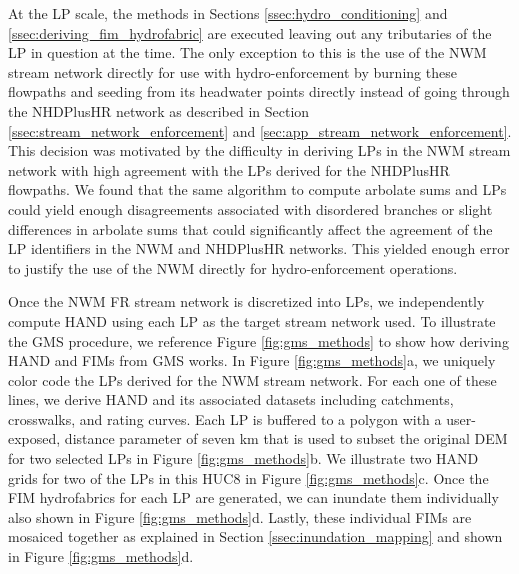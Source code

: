 At the LP scale, the methods in Sections \ref{ssec:hydro_conditioning} and \ref{ssec:deriving_fim_hydrofabric} are executed leaving out any tributaries of the LP in question at the time.
The only exception to this is the use of the NWM stream network directly for use with hydro-enforcement by burning these flowpaths and seeding from its headwater points directly instead of going through the NHDPlusHR network as described in Section \ref{ssec:stream_network_enforcement} and \ref{sec:app_stream_network_enforcement}.
This decision was motivated by the difficulty in deriving LPs in the NWM stream network with high agreement with the LPs derived for the NHDPlusHR flowpaths.
We found that the same algorithm to compute arbolate sums and LPs could yield enough disagreements associated with disordered branches or slight differences in arbolate sums that could significantly affect the agreement of the LP identifiers in the NWM and NHDPlusHR networks.
This yielded enough error to justify the use of the NWM directly for hydro-enforcement operations.

Once the NWM FR stream network is discretized into LPs, we independently compute HAND using each LP as the target stream network used.
To illustrate the GMS procedure, we reference Figure \ref{fig:gms_methods} to show how deriving HAND and FIMs from GMS works.
In Figure \ref{fig:gms_methods}a, we uniquely color code the LPs derived for the NWM stream network. 
For each one of these lines, we derive HAND and its associated datasets including catchments, crosswalks, and rating curves.
Each LP is buffered to a polygon with a user-exposed, distance parameter of seven km that is used to subset the original DEM for two selected LPs in Figure \ref{fig:gms_methods}b.
We illustrate two HAND grids for two of the LPs in this HUC8 in Figure \ref{fig:gms_methods}c.
Once the FIM hydrofabrics for each LP are generated, we can inundate them individually also shown in Figure \ref{fig:gms_methods}d.
Lastly, these individual FIMs are mosaiced together as explained in Section \ref{ssec:inundation_mapping} and shown in Figure \ref{fig:gms_methods}d.

